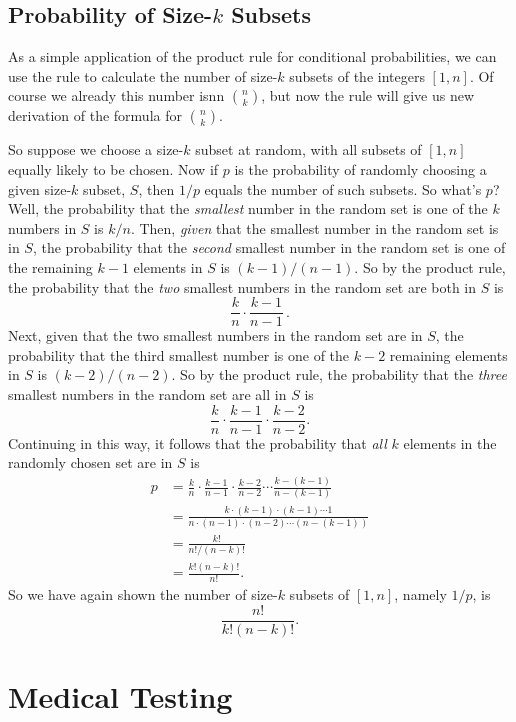 \subsection{Probability of Size-$k$ Subsets}
As a simple application of the product rule for conditional
probabilities, we can use the rule to calculate the number of size-$k$
subsets of the integers $[1,n]$.  Of course we already this number
isnn $\binom{n}{k}$, but now the rule will give us new derivation of
the formula for $\binom{n}{k}$.

So suppose we choose a size-$k$ subset at random, with all subsets of
$[1,n]$ equally likely to be chosen.  Now if $p$ is the probability of
randomly choosing a given size-$k$ subset, $S$, then $1/p$ equals the number of
such subsets.  So what's $p$?  Well, the probability
that the \emph{smallest} number in the random set is one of the $k$
numbers in $S$ is $k/n$.  Then, \emph{given} that the smallest number
in the random set is in $S$, the probability that the \emph{second}
smallest number in the random set is one of the remaining $k-1$
elements in $S$ is $(k-1)/(n-1)$.  So by the product rule, the
probability that the \emph{two} smallest numbers in the random set are
both in $S$ is
\[
\frac{k}{n} \cdot \frac{k-1}{n-1}\, .
\]
Next, given that the two smallest numbers in the random set are in
$S$, the probability that the third smallest number is one of the
$k-2$ remaining elements in $S$ is $(k-2)/(n-2)$.  So by the product
rule, the probability that the \emph{three} smallest numbers in the
random set are all in $S$ is
\[
\frac{k}{n} \cdot \frac{k-1}{n-1} \cdot \frac{k-2}{n-2}.
\]
Continuing in this way, it follows that the probability that
\emph{all} $k$ elements in the randomly chosen set are in $S$ is
\begin{align*}
p & = \frac{k}{n} \cdot \frac{k-1}{n-1} \cdot \frac{k-2}{n-2}
              \cdots \frac{k-(k-1)}{n-(k-1)}\\
  & = \frac{k \cdot (k-1) \cdot (k-1) \cdots 1}%
           {n \cdot (n-1) \cdot (n-2) \cdots (n-(k-1))}\\
  & = \frac{k!}{n!/(n-k)!}\\
  & = \frac{k!(n-k)!}{n!}.
\end{align*}
So we have again shown the number of size-$k$ subsets of $[1,n]$,
namely $1/p$, is
\[
\frac{n!}{k!(n-k)!}.
\]


\section{Medical Testing}\label{med_test-subsection}

